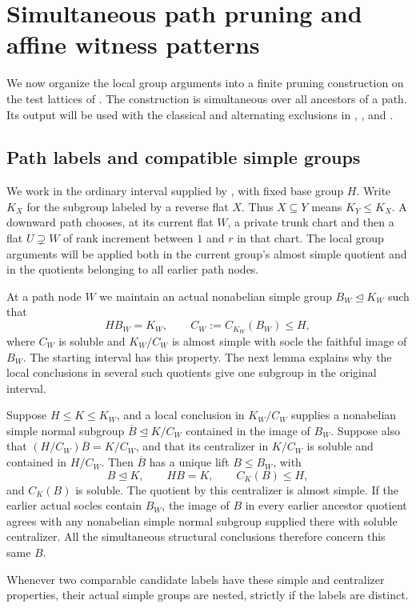 \section{Simultaneous path pruning and affine witness patterns}\label{sec:patterns}

We now organize the local group arguments into a finite pruning construction on the test lattices of . The construction is simultaneous over all ancestors of a path. Its output will be used with the classical and alternating exclusions in , , and .

\subsection{Path labels and compatible simple groups}

We work in the ordinary interval supplied by
, with fixed base group $H$.
Write $K_X$ for the subgroup labeled by a reverse flat $X$. Thus
$X\subseteq Y$ means $K_Y\le K_X$. A downward path chooses, at its current
flat $W$, a private trunk chart and then a flat $U\supsetneq W$ of rank
increment between $1$ and $r$ in that chart. The local group arguments
will be applied both in the current group's almost simple quotient and
in the quotients belonging to all earlier path nodes.

At a path node $W$ we maintain an actual nonabelian simple group
$B_W\trianglelefteq K_W$ such that
\[
 HB_W=K_W,\qquad C_W:=C_{K_W}(B_W)\le H,
\]
where $C_W$ is soluble and $K_W/C_W$ is almost simple with socle the
faithful image of $B_W$. The starting interval has this property. The
next lemma explains why the local conclusions in several such quotients
give one subgroup in the original interval.

\begin{lemma}\label{c:ancestor-socles}
Suppose $H\le K\le K_W$, and a local conclusion in $K_W/C_W$ supplies
a nonabelian simple normal subgroup $\overline B\trianglelefteq K/C_W$
contained in the image of $B_W$. Suppose also that
$(H/C_W)\overline B=K/C_W$, and that its centralizer in $K/C_W$ is
soluble and contained in $H/C_W$. Then $\overline B$ has a unique lift
$B\le B_W$, with
\[
 B\trianglelefteq K,\qquad HB=K,\qquad C_K(B)\le H,
\]
and $C_K(B)$ is soluble. The quotient by this centralizer is almost simple.
If the earlier actual socles contain $B_W$, the image of $B$ in every
earlier ancestor quotient agrees with any nonabelian simple normal
subgroup supplied there with soluble centralizer. All the simultaneous
structural conclusions therefore concern this same $B$.

Whenever two comparable candidate labels have these simple and
centralizer properties, their actual simple groups are nested, strictly
if the labels are distinct.
\end{lemma}

